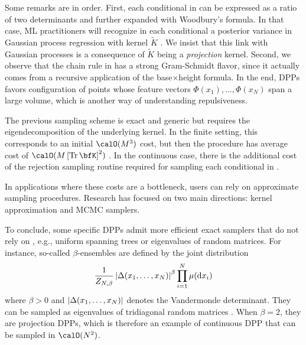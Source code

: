 \documentclass[twoside,11pt]{article}
\begin{document}
      Some remarks are in order.
      First, each conditional in  can be expressed as a ratio of two determinants and further expanded with Woodbury's formula.
      In that case, ML practitioners will recognize in each conditional a posterior variance in Gaussian process regression with kernel $\tilde K$ \cite[Equation 2.26]{RaWi06}. We insist that this link with Gaussian processes is a consequence of $\tilde K$ being a \emph{projection} kernel.
      Second, we observe that the chain rule in  has a strong Gram-Schmidt flavor, since it actually comes from a recursive application of the base$\times$height formula.
      In the end, DPPs favors configuration of points whose feature vectors $\Phi(x_1),\dots, \Phi(x_N)$ span a large volume, which is another way of understanding repulsiveness.

      The previous sampling scheme is exact and generic but requires the eigendecomposition of the underlying kernel.
      In the finite setting, this corresponds to an initial $\calO(M^3)$ cost, but then the procedure has average cost of $\calO(M\lrb{\Tr \bfK}^2)$
      \citep{TrBaAm18}.
      In the continuous case, there is the additional cost of the rejection sampling routine required for sampling each conditional in .

      In applications where these costs are a bottleneck, users can rely on approximate sampling procedures. Research has focused on two main directions: kernel approximation and MCMC samplers.

      To conclude, some specific DPPs admit more efficient exact samplers that do not rely on , e.g., uniform spanning trees \citep{PrWi98} or eigenvalues of random matrices. For instance, so-called $\beta$-ensembles are defined by the joint distribution
      \begin{equation*}
        \frac{1}{Z_{N,\beta}}
        \left| \Delta(x_1,\dots,x_N) \right|^{\beta}
        \prod_{i= 1}^N
          \mu(\mathop{}\!\mathrm{d} x_i)
      \end{equation*}
      where $\beta>0$ and $\left| \Delta(x_1,\dots,x_N) \right|$ denotes the Vandermonde determinant. They can be sampled as eigenvalues of tridiagonal random matrices \citep{DuEd02}. When $\beta=2$, they are projection DPPs, which is therefore an example of continuous DPP that can be sampled in $\calO(N^2)$.

\end{document}
